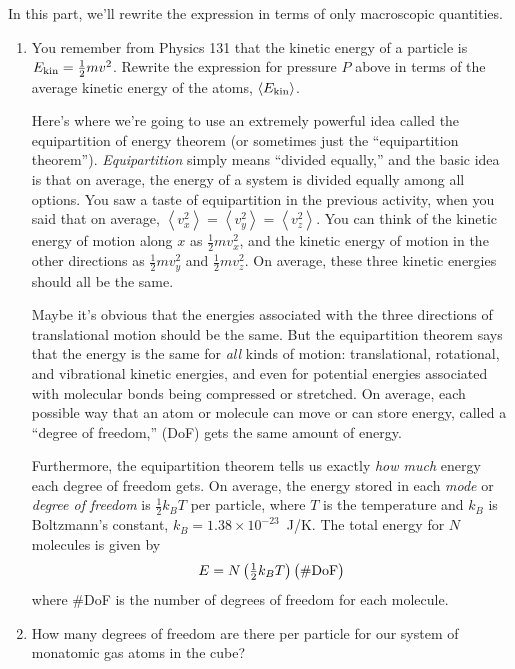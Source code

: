 In this part, we'll rewrite the expression in terms of only macroscopic quantities.  

\begin{enumerate}[labparts]

\item You remember from Physics 131 that the kinetic energy of a particle is $E_{\rm kin} = \frac{1}{2}mv^2$.  Rewrite the expression for pressure $P$ above in terms of the average kinetic energy of the atoms, $\left<  E_{\rm kin} \right>$.
\answerspace{0.4in}

Here's where we're going to use an extremely powerful idea called the equipartition of energy theorem (or sometimes just the ``equipartition theorem'').  \textit{Equipartition} simply means ``divided equally,'' and the basic idea is that on average, the energy of a system is divided equally among all options.
You saw a taste of equipartition in the previous activity, when you said that on average, $ \left< v_x^2 \right >= \left< v_y^2 \right > = \left< v_z^2 \right > $.  You can think of the kinetic energy of motion along $x$ as 
$\frac{1}{2}mv_x^2$, and the kinetic energy of motion in the other directions as $\frac{1}{2}mv_y^2$ and $\frac{1}{2}mv_z^2$.  On average, these three kinetic energies should all be the same.

Maybe it's obvious that the energies associated with the three directions of translational motion should be the same.  But the equipartition theorem says that the energy is the same for \textit{all} kinds of motion: translational, rotational, and vibrational kinetic energies, and even for potential energies associated with molecular bonds being compressed or stretched.  On average, each possible way that an atom or molecule can move or can store energy, called a ``degree of freedom,'' (DoF) gets the same amount of energy.

Furthermore, the equipartition theorem tells us exactly \textit{how much} energy each degree of freedom gets.  On average, the energy stored in each \textit{mode} or \textit{degree of freedom} is $\frac{1}{2}k_BT$ per particle, where $T$ is the temperature and $k_B$ is Boltzmann's constant, $k_B=1.38 \times 10^{-23}$~J/K.  The total energy for $N$ molecules is given by
$$\textstyle E=N\left(\frac{1}{2}k_BT\right)\bigl({\rm \#DoF}\bigr)$$
where \#DoF is the number of degrees of freedom for each molecule.

\item How many degrees of freedom are there per particle for our system of monatomic gas atoms in the cube?
\answerspace{0.4in}


\end{enumerate}
